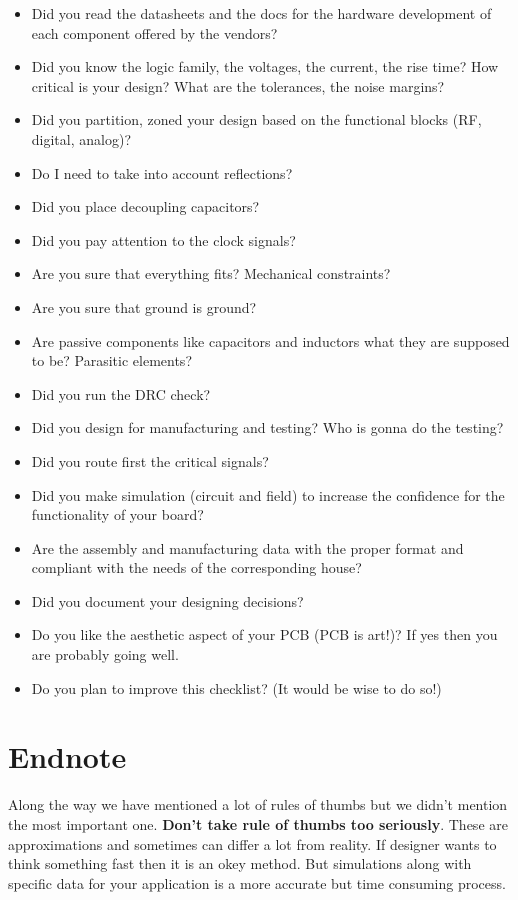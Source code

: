 \documentclass[final]{cubedoc}
\begin{document}
	\begin{itemize}
		\item Did you read the datasheets and the docs for the hardware development of each component offered by the vendors?
		\item Did you know the logic family, the voltages, the current, the rise time? How critical is your design?  What are the tolerances, the noise margins? 
		\item Did you partition, zoned your design based on the functional blocks (RF, digital, analog)?
		\item Do I need to take into account reflections? 
		\item Did you place decoupling capacitors?
		\item Did you pay attention to the clock signals?
		\item Are you sure that everything fits? Mechanical constraints?
		\item Are you sure that ground is ground?
		\item Are passive components like capacitors and inductors what they are supposed to be? Parasitic elements?
		\item Did you run the DRC check?
		\item Did you design for manufacturing and testing? Who is gonna do the testing?
		\item Did you route first the critical signals?
		\item Did you make simulation (circuit and field) to increase the confidence for the functionality of your board? 
		\item Are the assembly and manufacturing data with the proper format and compliant with the needs of the corresponding house?	
		\item Did you document your designing decisions?
		\item Do you like the aesthetic aspect of your PCB (PCB is art!)? If yes then you are probably going well.
		\item Do you plan to improve this checklist? (It would be wise to do so!)
	\end{itemize}
	
	\section{Endnote}
	
	Along the way we have mentioned a lot of rules of thumbs but we didn't mention the most important one. \textbf{Don't take rule of thumbs too seriously}. These are approximations and sometimes can differ a lot from reality. If designer wants to think something fast then it is an okey method. But simulations along with specific data for your application is a more accurate but time consuming process. 
	
\end{document}
